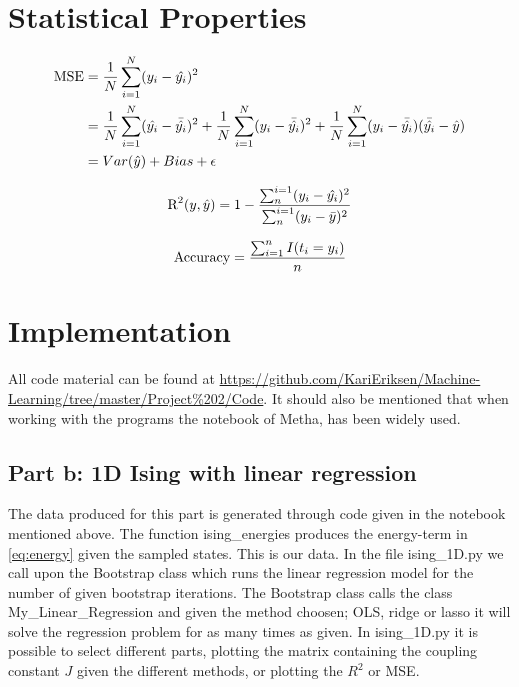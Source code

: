 \documentclass[a4paper,12pt, english]{article}
\begin{document}
\section{Statistical Properties}

\begin{align} \label{eq:MSE}
\textnormal{MSE} &= \frac{1}{N} \sum_{i=1}^N (y_i - \hat{y_i})^2 \\
&= \frac{1}{N} \sum_{i=1}^N (\hat{y_i} - \bar{\hat{y_i}})^2 + \frac{1}{N} \sum_{i=1}^N (y_i - \bar{\hat{y_i}})^2 + \frac{1}{N} \sum_{i=1}^N (y_i - \bar{\hat{y_i}})(\bar{\hat{y_i}} - \hat{y}) \\
&= Var(\hat{y}) + Bias + \epsilon
\end{align}

\begin{equation}
\textnormal{R}^2(y,\hat{y}) = 1 - \frac{\sum_{n}^{i=1} (y_i - \hat{y_i})^2}{\sum_{n}^{i=1}(y_i - \bar{y})^2}
\end{equation}

\begin{equation}
\textnormal{Accuracy} = \frac{\sum_{i=1}^n I(t_i = y_i)}{n}
\end{equation}

\section{Implementation}

All code material can be found at \url{https://github.com/KariEriksen/Machine-Learning/tree/master/Project%202/Code}.
It should also be mentioned that when working with the programs the notebook of Metha,\cite{high-bias-notebook} has been widely used. 

\subsection{Part b: 1D Ising with linear regression} \label{sec:part_b}

The data produced for this part is generated through code given in the notebook mentioned above. The function ising\_energies produces the energy-term in \ref{eq:energy} given the sampled states. This is our data. In the file ising\_1D.py we call upon the Bootstrap class which runs the linear regression model for the number of given bootstrap iterations. The Bootstrap class calls the class My\_Linear\_Regression and given the method choosen; OLS, ridge or lasso it will solve the regression problem for as many times as given. 
In ising\_1D.py it is possible to select different parts, plotting the matrix containing the coupling constant $J$ given the different methods, or plotting the $R^2$ or MSE.  
\end{document}
